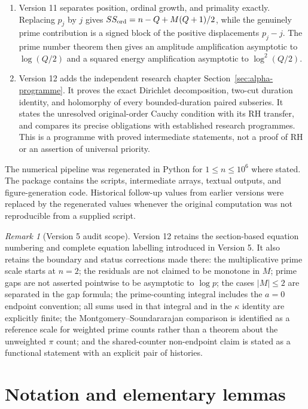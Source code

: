 \documentclass[11pt]{amsart}
\numberwithin{equation}{section}
\theoremstyle{plain}
\theoremstyle{definition}
\theoremstyle{remark}
\newtheorem{remark}[theorem]{Remark}
\begin{document}
\begin{enumerate}[label=(\roman*)]
needed to deduce a new bound for $M$.
\item Version 11 separates position, ordinal growth, and primality exactly.
Replacing $p_j$ by $j$ gives
$SS_{\rm ord}=n-Q+M(Q+1)/2$, while the genuinely prime contribution is a
signed block of the positive displacements $p_j-j$.  The prime number theorem
then gives an amplitude amplification asymptotic to $\log(Q/2)$ and a squared
energy amplification asymptotic to $\log^2(Q/2)$.
\item Version 12 adds the independent research chapter
Section~\ref{sec:alpha-programme}. It proves the exact Dirichlet decomposition,
two-cut duration identity, and holomorphy of every bounded-duration paired
subseries. It states the unresolved original-order Cauchy condition with its
RH transfer, and compares its precise obligations with established research
programmes. This is a programme with proved intermediate statements, not a
proof of RH or an assertion of universal priority.
\end{enumerate}

The numerical pipeline was regenerated in Python for $1\le n\le10^{6}$ where
stated.  The package contains the scripts, intermediate arrays, textual outputs,
and figure-generation code.  Historical follow-up values from earlier versions
were replaced by the regenerated values whenever the original computation was
not reproducible from a supplied script.

\begin{remark}[Version 5 audit scope]
\label{rem:v5-audit}
Version 12 retains the section-based equation numbering and complete equation labelling
introduced in Version 5. It also retains the boundary and status corrections made there: the
multiplicative prime scale starts at $n=2$; the residuals are not claimed to be
monotone in $M$; prime gaps are not asserted pointwise to be asymptotic to
$\log p$; the cases $|M|\le2$ are separated in the gap formula; the
prime-counting integral includes the $a=0$ endpoint convention; all sums used
in that integral and in the $\kappa$ identity are explicitly finite; the
Montgomery--Soundararajan comparison is identified as a reference scale for
weighted prime counts rather than a theorem about the unweighted $\pi$ count;
and the shared-counter non-endpoint claim is stated as a functional statement
with an explicit pair of histories.
\end{remark}

\section{Notation and elementary lemmas}
\label{sec:notation}
\end{document}
